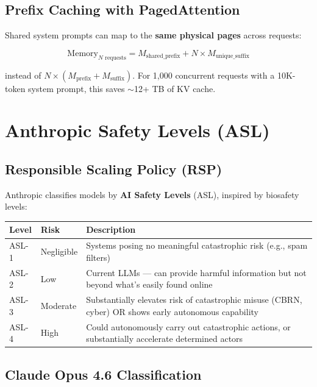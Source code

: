 \documentclass[11pt,a4paper]{article}
\begin{document}
\subsection{Prefix Caching with PagedAttention}

Shared system prompts can map to the \textbf{same physical pages} across requests:

$$\text{Memory}_{N\text{ requests}} = M_{\text{shared\_prefix}} + N \times M_{\text{unique\_suffix}}$$

instead of $N \times (M_{\text{prefix}} + M_{\text{suffix}})$. For 1,000 concurrent requests with a 10K-token system prompt, this saves $\sim$12+ TB of KV cache.

\section{Anthropic Safety Levels (ASL)}

\subsection{Responsible Scaling Policy (RSP)}

Anthropic classifies models by \textbf{AI Safety Levels} (ASL), inspired by biosafety levels:

\begin{center}
\begin{tabular}{llL{7cm}}
\toprule
\textbf{Level} & \textbf{Risk} & \textbf{Description} \\
\midrule
ASL-1 & Negligible & Systems posing no meaningful catastrophic risk (e.g., spam filters) \\
ASL-2 & Low & Current LLMs --- can provide harmful information but not beyond what's easily found online \\
ASL-3 & Moderate & Substantially elevates risk of catastrophic misuse (CBRN, cyber) OR shows early autonomous capability \\
ASL-4 & High & Could autonomously carry out catastrophic actions, or substantially accelerate determined actors \\
\bottomrule
\end{tabular}
\end{center}

\subsection{Claude Opus 4.6 Classification}
\end{document}
